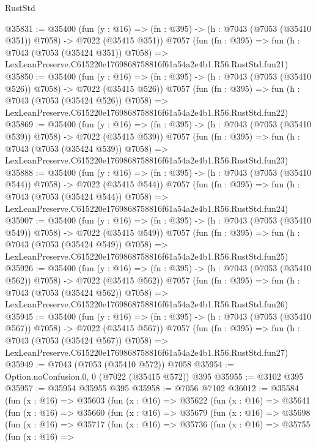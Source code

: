 \begin{lexlean}{RustStd}
\begin{coremodule}
@35831 := @35400
    (fun (y : @16) => (fn : @395) -> (h : @7043 (@7053 (@35410 @351)) @7058) -> @7022 (@35415 @351))
    @7057
    (fun (fn : @395) =>
    fun (h : @7043 (@7053 (@35424 @351)) @7058) =>
    LexLeanPreserve.C615220e1769868758816f61a54a2e4b1.R56.RustStd.fun21)
@35850 := @35400
    (fun (y : @16) => (fn : @395) -> (h : @7043 (@7053 (@35410 @526)) @7058) -> @7022 (@35415 @526))
    @7057
    (fun (fn : @395) =>
    fun (h : @7043 (@7053 (@35424 @526)) @7058) =>
    LexLeanPreserve.C615220e1769868758816f61a54a2e4b1.R56.RustStd.fun22)
@35869 := @35400
    (fun (y : @16) => (fn : @395) -> (h : @7043 (@7053 (@35410 @539)) @7058) -> @7022 (@35415 @539))
    @7057
    (fun (fn : @395) =>
    fun (h : @7043 (@7053 (@35424 @539)) @7058) =>
    LexLeanPreserve.C615220e1769868758816f61a54a2e4b1.R56.RustStd.fun23)
@35888 := @35400
    (fun (y : @16) => (fn : @395) -> (h : @7043 (@7053 (@35410 @544)) @7058) -> @7022 (@35415 @544))
    @7057
    (fun (fn : @395) =>
    fun (h : @7043 (@7053 (@35424 @544)) @7058) =>
    LexLeanPreserve.C615220e1769868758816f61a54a2e4b1.R56.RustStd.fun24)
@35907 := @35400
    (fun (y : @16) => (fn : @395) -> (h : @7043 (@7053 (@35410 @549)) @7058) -> @7022 (@35415 @549))
    @7057
    (fun (fn : @395) =>
    fun (h : @7043 (@7053 (@35424 @549)) @7058) =>
    LexLeanPreserve.C615220e1769868758816f61a54a2e4b1.R56.RustStd.fun25)
@35926 := @35400
    (fun (y : @16) => (fn : @395) -> (h : @7043 (@7053 (@35410 @562)) @7058) -> @7022 (@35415 @562))
    @7057
    (fun (fn : @395) =>
    fun (h : @7043 (@7053 (@35424 @562)) @7058) =>
    LexLeanPreserve.C615220e1769868758816f61a54a2e4b1.R56.RustStd.fun26)
@35945 := @35400
    (fun (y : @16) => (fn : @395) -> (h : @7043 (@7053 (@35410 @567)) @7058) -> @7022 (@35415 @567))
    @7057
    (fun (fn : @395) =>
    fun (h : @7043 (@7053 (@35424 @567)) @7058) =>
    LexLeanPreserve.C615220e1769868758816f61a54a2e4b1.R56.RustStd.fun27)
@35949 := @7043 (@7053 (@35410 @572)) @7058
@35954 := Option.noConfusion.{0, 0} (@7022 (@35415 @572)) @395
@35955 := @3102 @395
@35957 := @35954 @35955 @395
@35958 := @7056 @7102
@36012 := @35584
    (fun (x : @16) =>
    @35603
      (fun (x : @16) =>
      @35622
        (fun (x : @16) =>
        @35641
          (fun (x : @16) =>
          @35660
            (fun (x : @16) =>
            @35679
              (fun (x : @16) =>
              @35698
                (fun (x : @16) =>
                @35717
                  (fun (x : @16) =>
                  @35736
                    (fun (x : @16) =>
                    @35755
                      (fun (x : @16) =>

\end{coremodule}
\end{lexlean}
